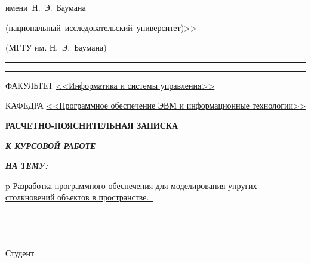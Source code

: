 \begin{titlepage}
\begin{center}
\begin{minipage}{0.85\textwidth}
{{                имени~Н.~Э.~Баумана

                (национальный~исследовательский~университет)>>
            }

                {(МГТУ им. Н.~Э.~Баумана)}
                \vspace{0.1cm}
            }
        \end{minipage}

        \vspace{0.2cm}
        \rule{\linewidth}{2.8pt}
        \rule[3ex]{\linewidth}{1pt}

        \begin{flushleft}
            {ФАКУЛЬТЕТ \uline{<<Информатика и системы управления>> \hfill}}

            \vspace{0.5cm}

            {КАФЕДРА \uline{<<Программное обеспечение ЭВМ и информационные технологии>> \hfill}}
        \end{flushleft}

        \vspace{2cm}

        {
            \Large{\textbf{РАСЧЕТНО-ПОЯСНИТЕЛЬНАЯ ЗАПИСКА}}

            \vspace{0.8cm}

            \large{\textbf{\textit{К КУРСОВОЙ РАБОТЕ}}}

            \vspace{0.75cm}

            \large{\textbf{\textit{НА ТЕМУ:}}}
        }

        \vspace{0.5cm}


        \begin{tabular}{p{\textwidth}}
            \uline
            {
                \large Разработка программного обеспечения для моделирования упругих столкновений объектов в пространстве. \hfill \,
            }
            \rule{\linewidth}{0.4pt}
            \rule{\linewidth}{0.4pt}
            \rule{\linewidth}{0.4pt}
            \rule{\linewidth}{0.4pt}
        \end{tabular}


        \vfill

        \begin{flushleft}
            {Студент } \hfill
            

\end{flushleft}
\end{center}
\end{titlepage}
